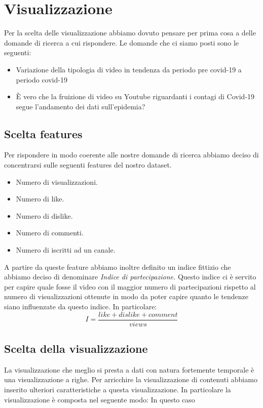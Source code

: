 \documentclass[10pt, a4paper,openany]{article}
\begin{document}
\section*{Visualizzazione}
Per la scelta delle visualizzazione abbiamo dovuto pensare per prima cosa a delle domande di ricerca a cui rispondere. Le domande che ci siamo posti sono le seguenti:
\begin{itemize}
	\item Variazione della tipologia di video in tendenza da periodo pre covid-19 a periodo covid-19
	\item È vero che la fruizione di video su Youtube riguardanti i contagi di Covid-19 segue l'andamento dei dati sull'epidemia?
\end{itemize}

\subsection*{Scelta features}
Per rispondere in modo coerente alle nostre domande di ricerca abbiamo deciso di concentrarsi sulle seguenti features del nostro dataset.
\begin{itemize}
	\item Numero di visualizzazioni.
	\item Numero di like.
	\item Numero di dislike.
	\item Numero di commenti.
	\item Numero di iscritti ad un canale.
\end{itemize}

A partire da queste feature abbiamo inoltre definito un indice fittizio che abbiamo deciso di denominare \textit{Indice di partecipazione.} Questo indice ci è servito per capire quale fosse il video con il maggior numero di partecipazioni rispetto al numero di visualizzazioni ottenute in modo da poter capire quanto le tendenze siano influenzate da questo indice. In particolare:
\[ I = \frac{like+dislike+comment}{views}\]
\subsection*{Scelta della visualizzazione}
La visualizzazione che meglio si presta a dati con natura fortemente temporale è una visualizzazione a righe. Per arricchire la visualizzazione di contenuti abbiamo inserito ulteriori caratteristiche a questa visualizzazione. In particolare la visualizzazione è composta nel seguente modo:
In questo caso 
\end{document}
